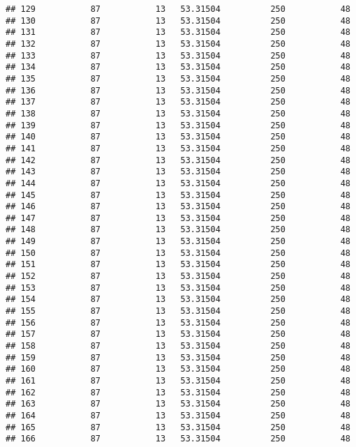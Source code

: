 \documentclass[]{article}
\begin{document}
\begin{verbatim}
## 129           87           13   53.31504          250           48
## 130           87           13   53.31504          250           48
## 131           87           13   53.31504          250           48
## 132           87           13   53.31504          250           48
## 133           87           13   53.31504          250           48
## 134           87           13   53.31504          250           48
## 135           87           13   53.31504          250           48
## 136           87           13   53.31504          250           48
## 137           87           13   53.31504          250           48
## 138           87           13   53.31504          250           48
## 139           87           13   53.31504          250           48
## 140           87           13   53.31504          250           48
## 141           87           13   53.31504          250           48
## 142           87           13   53.31504          250           48
## 143           87           13   53.31504          250           48
## 144           87           13   53.31504          250           48
## 145           87           13   53.31504          250           48
## 146           87           13   53.31504          250           48
## 147           87           13   53.31504          250           48
## 148           87           13   53.31504          250           48
## 149           87           13   53.31504          250           48
## 150           87           13   53.31504          250           48
## 151           87           13   53.31504          250           48
## 152           87           13   53.31504          250           48
## 153           87           13   53.31504          250           48
## 154           87           13   53.31504          250           48
## 155           87           13   53.31504          250           48
## 156           87           13   53.31504          250           48
## 157           87           13   53.31504          250           48
## 158           87           13   53.31504          250           48
## 159           87           13   53.31504          250           48
## 160           87           13   53.31504          250           48
## 161           87           13   53.31504          250           48
## 162           87           13   53.31504          250           48
## 163           87           13   53.31504          250           48
## 164           87           13   53.31504          250           48
## 165           87           13   53.31504          250           48
## 166           87           13   53.31504          250           48

\end{verbatim}
\end{document}
